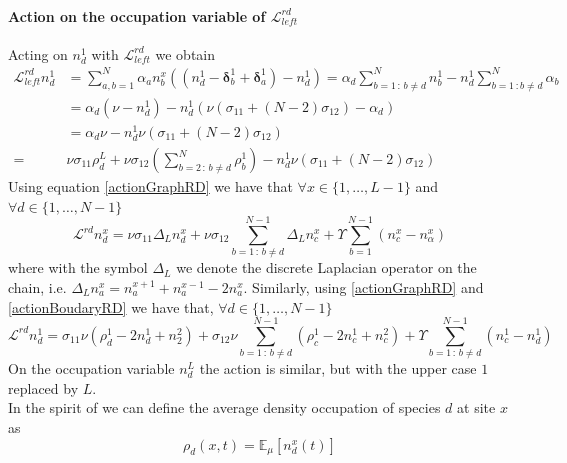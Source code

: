 \documentclass[10pt]{article}
\numberwithin{equation}{section}
\numberwithin{equation}{subsection}
\begin{document}
\paragraph{Action on the occupation variable of $\mathcal{L}_{left}^{rd}$}
Acting on $n_{d}^{1}$  with $\mathcal{L}_{left}^{rd}$ we obtain
\begin{equation}\label{actionBoudaryRD}
	\begin{split}
		\mathcal{L}_{left}^{rd}n_{d}^{1}&=\sum_{a,b=1}^{N}\alpha_{a}n_{b}^{x}\left((n_{d}^{1}-\bm{\delta}_{b}^{1}+\bm{\delta}_{a}^{1})-n_{d}^{1}\right)=\alpha_{d}\sum_{b=1\,:\,b\neq d}^{N}n_{b}^{1}-n_{d}^{1}\sum_{b=1\,:b\neq d}^{N}\alpha_{b}
		\\&=
		\alpha_{d}\left(\nu-n_{d}^{1}\right)-n_{d}^{1}\left(\nu(\sigma_{11}+(N-2)\sigma_{12})-\alpha_{d}\right)
		\\&=\alpha_{d}\nu-n_{d}^{1}\nu(\sigma_{11}+(N-2)\sigma_{12})
		\\=&
		\nu\sigma_{11}\rho_{d}^{L}+\nu\sigma_{12}\left(\sum_{b=2\,:\,b\neq d}^{N}\rho_{b}^{1}\right)-n_{d}^{1}\nu(\sigma_{11}+(N-2)\sigma_{12})
	\end{split}
\end{equation}
Using equation \eqref{actionGraphRD} we have that $\forall x\in \{1,\ldots,L-1\}$ and $\forall d\in\{1,\ldots,N-1\}$
\begin{equation}\label{DifferenceEquation}
	\mathcal{L}^{rd}n_{d}^{x}=\nu\sigma_{11}\Delta_{L}n_{d}^{x}+\nu\sigma_{12}\sum_{b=1\,:\,b\neq d}^{N-1}\Delta_{L}n_{c}^{x}+\Upsilon\sum_{b=1}^{N-1}(n_{c}^{x}-n_{\alpha}^{x})
\end{equation}
where with the symbol $\Delta_{L}$ we denote the discrete Laplacian operator on the chain, i.e. $\Delta_{L}n_{a}^{x}=n_{a}^{x+1}+n_{a}^{x-1}-2n_{a}^{x}$.
Similarly, using \eqref{actionGraphRD}  and \eqref{actionBoudaryRD} we have that, $\forall d\in \{1,\ldots,N-1\}$ 
\begin{equation}\label{actionBDLine}
	\mathcal{L}^{rd}n_{d}^{1}=\sigma_{11}\nu \left(\rho_{d}^{1}-2n_{d}^{1}+n_{2}^{2}\right)+\sigma_{12}\nu\sum_{b=1\,:\,b\neq d}^{N-1}\left(\rho_{c}^{1}-2n_{c}^{1}+n_{c}^{2}\right)+\Upsilon\sum_{b=1\,:\,b\neq d}^{N-1}\left(n_{c}^{1}-n_{d}^{1}\right)
\end{equation}
On the occupation variable $n_{d}^{L}$ the action is similar, but with the upper case $1$ replaced by $L$.\\ In the spirit of \cite{casini2022uphill} we can define the average density occupation of species $d$ at site $x$ as
\begin{equation}
	\rho_{d}(x,t)=\mathbb{E}_{\mu}\left[n_{d}^{x}(t)\right]
\end{equation}
\end{document}
